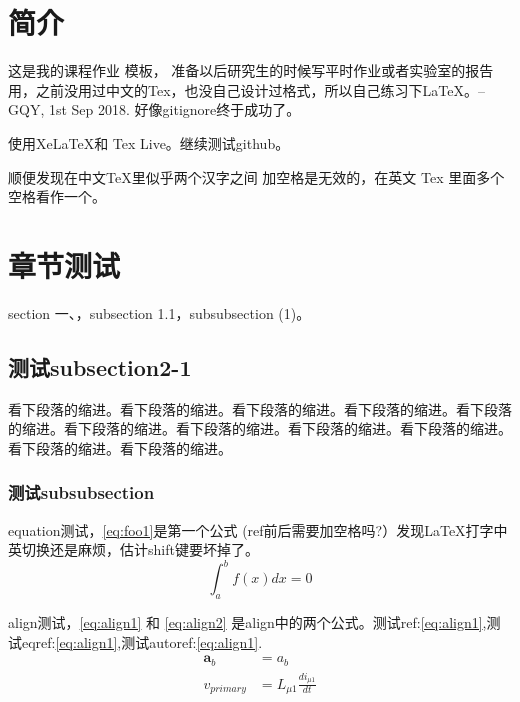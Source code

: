 \documentclass{myreport}
\begin{document}
\thispagestyle{empty}
\makemycover %




\clearpage
\newpage

\section{简介}
这是我的课程作业   模板，    准备以后研究生的时候写平时作业或者实验室的报告用，之前没用过中文的Tex，也没自己设计过格式，所以自己练习下\LaTeX。--GQY, 1st Sep 2018. 好像gitignore终于成功了。

使用XeLaTeX和 Tex Live。继续测试github。

顺便发现在中文TeX里似乎两个汉字之间   加空格是无效的，在英文 Tex 里面多个空格看作一个。


\section{章节测试}
section 一、，subsection 1.1，subsubsection (1)。
\subsection{测试subsection2-1}
看下段落的缩进。看下段落的缩进。看下段落的缩进。看下段落的缩进。看下段落的缩进。看下段落的缩进。看下段落的缩进。看下段落的缩进。看下段落的缩进。看下段落的缩进。看下段落的缩进。
\subsubsection{测试subsubsection}
equation测试，\eqref{eq:foo1}是第一个公式
{\color{red}(ref前后需要加空格吗?）}发现\LaTeX 打字中英切换还是麻烦，估计shift键要坏掉了。
\begin{equation}
\int_a^b f(x)dx = 0 \label{eq:foo1}
\end{equation}

align测试，\eqref{eq:align1} 和 \eqref{eq:align2} 是align中的两个公式。测试ref:\ref{eq:align1},测试eqref:\eqref{eq:align1},测试autoref:\autoref{eq:align1}.
\begin{align}
 \bm{a}_b &= a_b \label{eq:align1}\\
 v_{primary} &= L_{\mu 1}\frac{di_{\mu 1}}{dt} \label{eq:align2} 
\end{align}
\end{document}
